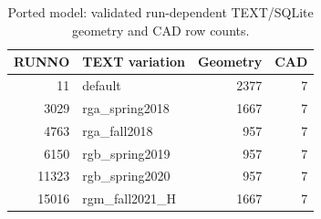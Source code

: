 \begin{table}[htbp]

\caption{Ported model: validated run-dependent TEXT/SQLite geometry and CAD row counts.}

\label{tab:5}

\centering

\small

\setlength{\tabcolsep}{4pt}

\renewcommand{\arraystretch}{1.15}

\begin{tabularx}{\textwidth}{@{}rXrr@{}}

\toprule

RUNNO & TEXT variation & Geometry & CAD \\

\midrule

11 & default & 2377 & 7 \\

3029 & rga\_spring2018 & 1667 & 7 \\

4763 & rga\_fall2018 & 957 & 7 \\

6150 & rgb\_spring2019 & 957 & 7 \\

11323 & rgb\_spring2020 & 957 & 7 \\

15016 & rgm\_fall2021\_H & 1667 & 7 \\

\bottomrule

\end{tabularx}

\end{table}
